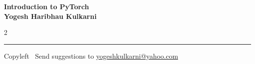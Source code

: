 \documentclass[8pt,landscape]{article}
\begin{document}
\footnotesize


\begin{center}
\Large{\textbf{Introduction to PyTorch\\ Yogesh Haribhau Kulkarni}}  
\end{center}

\begin{multicols}{2}

\end{multicols}

\rule{\linewidth}{0.25pt}
\scriptsize
Copyleft \textcopyleft\  Send suggestions to 
\href{http://yati.io}{yogeshkulkarni@yahoo.com}
\end{document}
